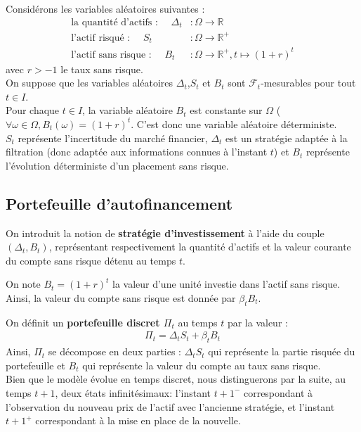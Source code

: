 Considérons les variables aléatoires suivantes :
\begin{align*}
    \text{la quantité d'actifs : } \quad \Delta_t& : \Omega \to \mathbb{R} \\
    \text{l'actif risqué : } \quad S_t& : \Omega \to \mathbb{R}^+ \\
    \text{l'actif sans risque : } \quad B_t& : \Omega \to \mathbb{R}^+, t \mapsto (1+r)^t
\end{align*}
avec $r>-1$ le taux sans risque. \\
On suppose que les variables aléatoires $\Delta_t$,$S_t$ et $B_t$ sont $\mathcal{F}_t$-mesurables pour tout
$t\in I$. \\
\remark Pour chaque $t \in I$, la variable aléatoire $B_t$ est constante sur $\Omega$ ($\forall \omega \in \Omega, B_t(\omega)=(1+r)^t$. C'est donc une variable aléatoire déterministe. \\
$S_t$ représente l'incertitude du marché financier, $\Delta_t$ est un stratégie adaptée à la filtration (donc adaptée aux informations connues à l'instant $t$) et $B_t$ représente l'évolution déterministe d'un placement sans risque. 

\pagebreak
\subsection{Portefeuille d'autofinancement}
On introduit la notion de \textbf{stratégie d'investissement} à l'aide du couple $(\Delta_t, B_t)$, représentant respectivement la quantité d'actifs et la valeur courante du compte sans risque détenu au temps $t$.

On note $B_t = (1+r)^t$ la valeur d'une unité investie dans l'actif sans risque. Ainsi, la valeur du compte sans risque est donnée par $\beta_t B_t$.

On définit un \textbf{portefeuille discret $\Pi_t$} au temps $t$ par la valeur :
\begin{align*}
    \Pi_t = \Delta_tS_t+\beta_tB_t 
\end{align*}
Ainsi, $\Pi_t$ se décompose en deux parties : $\Delta_tS_t$ qui représente la partie risquée du portefeuille et $B_t$ qui représente la valeur du compte au taux sans risque. 
\cite{Portefeuille} \\

\notation 
Bien que le modèle évolue en temps discret, nous distinguerons par la suite, au temps $t+1$, deux états infinitésimaux: l'instant $t+1^-$ correspondant à l'observation du nouveau prix de l'actif avec l'ancienne stratégie, et l'instant $t+1^+$ correspondant à la mise en place de la nouvelle. \\

